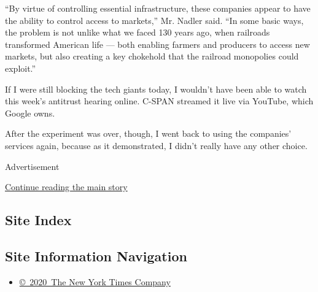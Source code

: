 ``By virtue of controlling essential infrastructure, these companies
appear to have the ability to control access to markets,'' Mr. Nadler
said. ``In some basic ways, the problem is not unlike what we faced 130
years ago, when railroads transformed American life --- both enabling
farmers and producers to access new markets, but also creating a key
chokehold that the railroad monopolies could exploit.''

If I were still blocking the tech giants today, I wouldn't have been
able to watch this week's antitrust hearing online. C-SPAN streamed it
live via YouTube, which Google owns.

After the experiment was over, though, I went back to using the
companies' services again, because as it demonstrated, I didn't really
have any other choice.

Advertisement

\protect\hyperlink{after-bottom}{Continue reading the main story}

\hypertarget{site-index}{%
\subsection{Site Index}\label{site-index}}

\hypertarget{site-information-navigation}{%
\subsection{Site Information
Navigation}\label{site-information-navigation}}

\begin{itemize}
\tightlist
\item
  \href{https://help.nytimes.com/hc/en-us/articles/115014792127-Copyright-notice}{©~2020~The
  New York Times Company}
\end{itemize}

